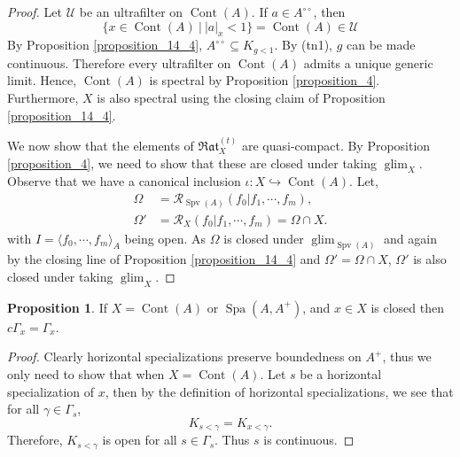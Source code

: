 \documentclass[10pt]{article}
\numberwithin{equation}{section}
\theoremstyle{definition}
\newtheorem{proposition}{Proposition}[subsection]
\DeclareMathOperator{\Spa}{Spa}
\DeclareMathOperator{\glim}{glim}
\DeclareMathOperator{\Spv}{Spv}
\DeclareMathOperator{\Cont}{Cont}
\newcommand{\U}[0]{\mathcal{U}}
\newcommand{\cR}[0]{\mathcal{R}}
\newcommand{\sep}[0]{\:|\:}
\newcommand{\ab}[1]{\vert #1 \vert}
\newcommand{\cGamma}[0]{c\Gamma}
\newcommand{\dcirc}[0]{{\circ\circ}}
\newcommand{\Rat}[0]{\mathfrak{Rat}}
\begin{document}
\begin{proof}
    Let $\U$ be an ultrafilter on $\Cont(A)$. If $a\in A^\dcirc$, then
    \begin{equation*}
        \{x\in\Cont(A)\sep \ab{a}_x<1\}=\Cont(A)\in\U
    \end{equation*}
    By Proposition \ref{proposition_14_4}, $A^{\dcirc}\subseteq K_{g<1}$. By (tn1), $g$ can be made continuous. Therefore every ultrafilter on $\Cont(A)$ admits a unique generic limit. Hence, $\Cont(A)$ is spectral by Proposition \ref{proposition_4}. Furthermore, $X$ is also spectral using the closing claim of Proposition \ref{proposition_14_4}.
    \par We now show that the elements of $\Rat_X^{(t)}$ are quasi-compact. By Proposition \ref{proposition_4}, we need to show that these are closed under taking $\glim_X$. Observe that we have a canonical inclusion $\iota:X\hookrightarrow \Cont(A)$. Let,
    \begin{align*}
        \Omega & = \cR_{\Spv(A)}(f_0|f_1,\cdots,f_m),\\
        \Omega' &= \cR_X(f_0|f_1,\cdots,f_m)=\Omega\cap X.
    \end{align*}
    with $I=\langle f_0,\cdots,f_m\rangle_A$ being open. As $\Omega$ is closed under $\glim_{\Spv(A)}$ and again by the closing line of Proposition \ref{proposition_14_4} and $\Omega' = \Omega\cap X$, $\Omega'$ is also closed under taking $\glim_X$.
\end{proof}

\begin{proposition}
    \label{fact_15_11}
    If $X = \Cont(A)$ or $\Spa(A,A^+)$, and $x\in X$ is closed then $\cGamma_x = \Gamma_x$.
\end{proposition}
\begin{proof}
    Clearly horizontal specializations preserve boundedness on $A^+$, thus we only need to show that when $X=\Cont(A)$. Let $s$ be a horizontal specialization of $x$, then by the definition of horizontal specializations, we see that for all $\gamma\in\Gamma_s$,
    \begin{equation*}
        K_{s<\gamma} = K_{x<\gamma}.
    \end{equation*}
    Therefore, $K_{s<\gamma}$ is open for all $s\in\Gamma_s$. Thus $s$ is continuous.
\end{proof}
\end{document}
